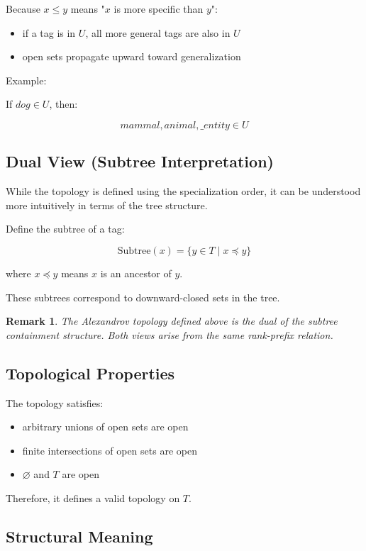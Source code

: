 \documentclass{article}
\newtheorem{remark}{Remark}[section]
\begin{document}
Because $x \leq y$ means "$x$ is more specific than $y$":

\begin{itemize}
    \item if a tag is in $U$, all more general tags are also in $U$
    \item open sets propagate upward toward generalization
\end{itemize}

Example:

If $dog \in U$, then:

\[
mammal, animal, \_entity \in U
\]

\subsection{Dual View (Subtree Interpretation)}

While the topology is defined using the specialization order, it can be
understood more intuitively in terms of the tree structure.

Define the subtree of a tag:

\[
\mathrm{Subtree}(x) = \{ y \in T \mid x \preceq y \}
\]

where $x \preceq y$ means $x$ is an ancestor of $y$.

These subtrees correspond to downward-closed sets in the tree.

\begin{remark}
The Alexandrov topology defined above is the dual of the subtree
containment structure. Both views arise from the same rank-prefix relation.
\end{remark}

\subsection{Topological Properties}

The topology satisfies:

\begin{itemize}
    \item arbitrary unions of open sets are open
    \item finite intersections of open sets are open
    \item $\varnothing$ and $T$ are open
\end{itemize}

Therefore, it defines a valid topology on $T$.

\subsection{Structural Meaning}
\end{document}
